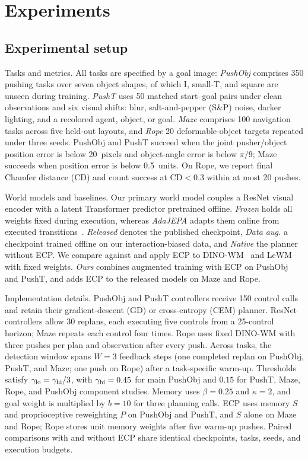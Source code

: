 \section{Experiments}
\label{sec:experiments}


\subsection{Experimental setup}
\par\smallskip\noindent Tasks and metrics.
All tasks are specified by a goal image: \emph{PushObj} comprises 350 pushing tasks over seven object shapes, of which I, small-T, and square are unseen during training. \emph{PushT} uses 50 matched start--goal pairs under clean observations and six visual shifts: blur, salt-and-pepper (S\&P) noise, darker lighting, and a recolored agent, object, or goal. \emph{Maze} comprises 100 navigation tasks across five held-out layouts, and \emph{Rope} 20 deformable-object targets repeated under three seeds. PushObj and PushT succeed when the joint pusher/object position error is below 20~pixels and object-angle error is below $\pi/9$; Maze succeeds when position error is below 0.5~units. On Rope, we report final Chamfer distance (CD) and count success at $\text{CD}<0.3$ within at most 20 pushes.

\par\smallskip\noindent World models and baselines.
Our primary world model couples a ResNet visual encoder with a latent Transformer predictor pretrained offline. \emph{Frozen} holds all weights fixed during execution, whereas \emph{AdaJEPA} adapts them online from executed transitions~\cite{wang2026adajepa}. \emph{Released} denotes the published checkpoint, \emph{Data aug.} a checkpoint trained offline on our interaction-biased data, and \emph{Native} the planner without ECP. We compare against and apply ECP to DINO-WM~\cite{zhou2025dinowm} and LeWM~\cite{maes2026lewm} with fixed weights. \emph{Ours} combines augmented training with ECP on PushObj and PushT, and adds ECP to the released models on Maze and Rope.

\par\smallskip\noindent Implementation details.
PushObj and PushT controllers receive 150 control calls and retain their gradient-descent (GD) or cross-entropy (CEM) planner. ResNet controllers allow 30 replans, each executing five controls from a 25-control horizon; Maze repeats each control four times. Rope uses fixed DINO-WM with three pushes per plan and observation after every push. Across tasks, the detection window spans $W=3$ feedback steps (one completed replan on PushObj, PushT, and Maze; one push on Rope) after a task-specific warm-up. Thresholds satisfy $\gamma_{\rm lo}=\gamma_{\rm hi}/3$, with $\gamma_{\rm hi}=0.45$ for main PushObj and $0.15$ for PushT, Maze, Rope, and PushObj component studies. Memory uses $\beta=0.25$ and $\kappa=2$, and goal weight is multiplied by $b=10$ for three planning calls. ECP uses memory $S$ and proprioceptive reweighting $P$ on PushObj and PushT, and $S$ alone on Maze and Rope; Rope stores unit memory weights after five warm-up pushes. Paired comparisons with and without ECP share identical checkpoints, tasks, seeds, and execution budgets.

